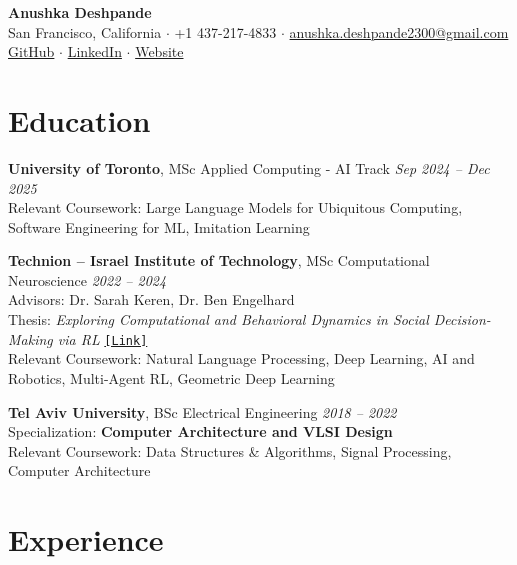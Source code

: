\documentclass[a4paper,10pt]{article}
\begin{document}
\begin{center}
    {\LARGE \textbf{Anushka Deshpande}}\\[4pt]
    San Francisco, California $\cdot$ +1 437-217-4833 $\cdot$ \href{mailto:anushka.deshpande2300@gmail.com}{anushka.deshpande2300@gmail.com}\\[2pt]
    \href{https://github.com/Anna4142}{GitHub} $\cdot$ \href{https://www.linkedin.com/in/anushka-d-4140061bb}{LinkedIn} $\cdot$ \href{https://anna4142.github.io/website}{Website}
\end{center}

\section{Education}
\textbf{University of Toronto}, MSc Applied Computing - AI Track \hfill \textit{Sep 2024 -- Dec 2025}\\
Relevant Coursework: Large Language Models for Ubiquitous Computing, Software Engineering for ML, Imitation Learning

\vspace{6pt}
\textbf{Technion -- Israel Institute of Technology}, MSc Computational Neuroscience \hfill \textit{2022 -- 2024}\\
Advisors: Dr. Sarah Keren, Dr. Ben Engelhard\\
Thesis: \textit{Exploring Computational and Behavioral Dynamics in Social Decision-Making via RL} \href{https://drive.google.com/file/d/1rFa0IbgcpIFTfLp23BFAhulSYonrGHEX/view}{\texttt{[Link]}}\\
Relevant Coursework: Natural Language Processing, Deep Learning, AI and Robotics, Multi-Agent RL, Geometric Deep Learning

\vspace{6pt}
\textbf{Tel Aviv University}, BSc Electrical Engineering \hfill \textit{2018 -- 2022}\\
Specialization: \textbf{Computer Architecture and VLSI Design}\\
Relevant Coursework: Data Structures \& Algorithms, Signal Processing, Computer Architecture

\section{Experience}
\end{document}
